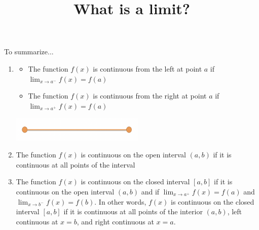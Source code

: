 \documentclass{ximera}
\title{What is a limit?}
\begin{document}
\begin{abstract}
\end{abstract}

To summarize...

\begin{explanation}
    \begin{enumerate}
        \item \begin{itemize}
            \item The function $f(x)$ is continuous from the left at point $a$ if $\lim_{x \to a^-} f(x) = f(a)$
            \item The function $f(x)$ is continuous from the right at point $a$ if $\lim_{x \to a^+} f(x) = f(a)$
        \end{itemize}
        \begin{center}            
        \includegraphics[width=0.5\textwidth]{graph4.png}
        \end{center}

    \item The function $f(x)$ is continuous on the open interval $(a,b)$ if it is continuous at all points of the interval

    \item The function $f(x)$ is continuous on the closed interval $[a,b]$ if it is continuous on the open interval $(a,b)$ and if $\lim_{x \to a^+} f(x) = f(a)$ and $\lim_{x \to b^-} f(x) = f(b)$.
        In other words, $f(x)$ is continuous on the closed interval $[a,b]$ if it is continuous at all points of the interior $(a,b)$, left continuous at $x=b$, and right continuous at $x=a$.
    \end{enumerate}
\end{explanation}
\end{document}

